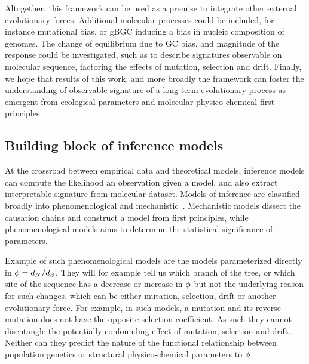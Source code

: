 Altogether, this framework can be used as a premise to integrate other external evolutionary forces. %
Additional molecular processes could be included, for instance mutational bias, or \gls{gBGC} inducing a bias in nucleic composition of genomes.
The change of equilibrium due to GC bias, and magnitude of the response could be investigated, such as to describe signatures observable on molecular sequence, factoring the effects of mutation, selection and drift.
Finally, we hope that results of this work, and more broadly the framework can foster the understanding of observable signature of a long-term evolutionary process as emergent from ecological parameters and molecular physico-chemical first principles.

\subsection{Building block of inference models}

At the crossroad between empirical data and theoretical models, inference models can compute the \gls{likelihood} an observation given a model, and also extract interpretable signature from molecular dataset.
Models of inference are classified broadly into phenomenological and mechanistic~\citep{Rodrigue2010a}.
Mechanistic models dissect the causation chains and construct a model from first principles, while phenomenological models aims to determine the statistical significance of parameters.

Example of such phenomenological models are the models parameterized directly in $\phi = d_N / d_S$.
They will for example tell us which branch of the tree, or which site of the sequence has a decrease or increase in $\phi$ but not the underlying reason for such changes, which can be either mutation, selection, drift or another evolutionary force.
For example, in such models, a mutation and its reverse mutation does not have the opposite selection coefficient.
As such they cannot disentangle the potentially confounding effect of mutation, selection and drift.
Neither can they predict the nature of the functional relationship between population genetics or structural physico-chemical parameters to $\phi$.

